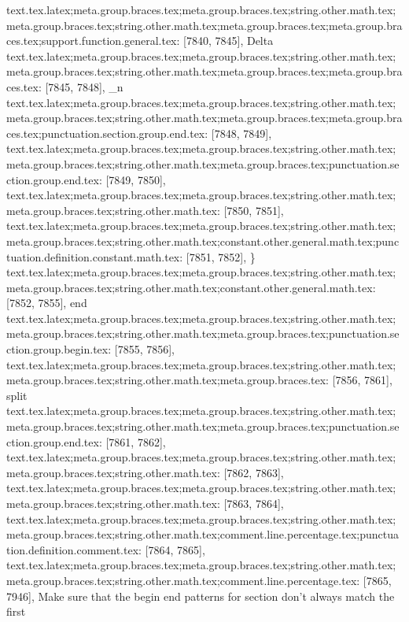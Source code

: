 {{{{{{{{{{{{{{{{{{{{{{{{{{{{{{{{{{{{{{{{{{{{{{{{{{{{{{{{{{{{{{{{{{{{{{{{{{{{{{{{{{{{{{{{{{{{{{{{{{{{{{{{{{{{{{{{{{{{{{{{{{{{{{{{{{{{{{{{{{{{{{{{{{{{{{{{{{{{{{{{{{{{{{{{{{{{{{{{{{{{{{{{{{{{{{{{{{{{{{{{{{{{{{{{{{{{{{{{{{{{{{{{{{{{{{{{{{text.tex.latex;meta.group.braces.tex;meta.group.braces.tex;string.other.math.tex;meta.group.braces.tex;string.other.math.tex;meta.group.braces.tex;meta.group.braces.tex;support.function.general.tex: [7840, 7845], {Delta}
text.tex.latex;meta.group.braces.tex;meta.group.braces.tex;string.other.math.tex;meta.group.braces.tex;string.other.math.tex;meta.group.braces.tex;meta.group.braces.tex: [7845, 7848], {_n }
text.tex.latex;meta.group.braces.tex;meta.group.braces.tex;string.other.math.tex;meta.group.braces.tex;string.other.math.tex;meta.group.braces.tex;meta.group.braces.tex;punctuation.section.group.end.tex: [7848, 7849], {}}
text.tex.latex;meta.group.braces.tex;meta.group.braces.tex;string.other.math.tex;meta.group.braces.tex;string.other.math.tex;meta.group.braces.tex;punctuation.section.group.end.tex: [7849, 7850], {}}
text.tex.latex;meta.group.braces.tex;meta.group.braces.tex;string.other.math.tex;meta.group.braces.tex;string.other.math.tex: [7850, 7851], {
}
text.tex.latex;meta.group.braces.tex;meta.group.braces.tex;string.other.math.tex;meta.group.braces.tex;string.other.math.tex;constant.other.general.math.tex;punctuation.definition.constant.math.tex: [7851, 7852], {\}
text.tex.latex;meta.group.braces.tex;meta.group.braces.tex;string.other.math.tex;meta.group.braces.tex;string.other.math.tex;constant.other.general.math.tex: [7852, 7855], {end}
text.tex.latex;meta.group.braces.tex;meta.group.braces.tex;string.other.math.tex;meta.group.braces.tex;string.other.math.tex;meta.group.braces.tex;punctuation.section.group.begin.tex: [7855, 7856], {{}
text.tex.latex;meta.group.braces.tex;meta.group.braces.tex;string.other.math.tex;meta.group.braces.tex;string.other.math.tex;meta.group.braces.tex: [7856, 7861], {split}
text.tex.latex;meta.group.braces.tex;meta.group.braces.tex;string.other.math.tex;meta.group.braces.tex;string.other.math.tex;meta.group.braces.tex;punctuation.section.group.end.tex: [7861, 7862], {}}
text.tex.latex;meta.group.braces.tex;meta.group.braces.tex;string.other.math.tex;meta.group.braces.tex;string.other.math.tex: [7862, 7863], {
}
text.tex.latex;meta.group.braces.tex;meta.group.braces.tex;string.other.math.tex;meta.group.braces.tex;string.other.math.tex: [7863, 7864], {
}
text.tex.latex;meta.group.braces.tex;meta.group.braces.tex;string.other.math.tex;meta.group.braces.tex;string.other.math.tex;comment.line.percentage.tex;punctuation.definition.comment.tex: [7864, 7865], {%
text.tex.latex;meta.group.braces.tex;meta.group.braces.tex;string.other.math.tex;meta.group.braces.tex;string.other.math.tex;comment.line.percentage.tex: [7865, 7946], { Make sure that the begin end patterns for section don't always match the first }}
}}}}}}}}}}}}}}}}}}}}}}}}}}}}}}}}}}}}}}}}}}}}}}}}}}}}}}}}}}}}}}}}}}}}}}}}}}}}}}}}}}}}}}}}}}}}}}}}}}}}}}}}}}}}}}}}}}}}}}}}}}}}}}}}}}}}}}}}}}}}}}}}}}}}}}}}}}}}}}}}}}}}}}}}}}}}}}}}}}}}}}}}}}}}}}}}}}}}}}}}}}}}}}}}}}}}}}}}}}}}}}}}}}}}}}}}}
